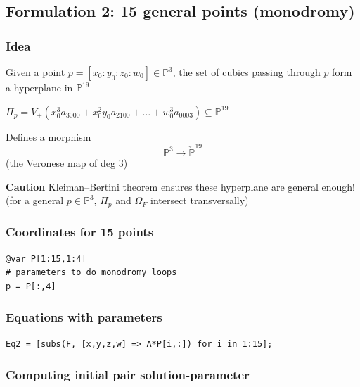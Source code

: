 \documentclass[11pt]{article}
\begin{document}
\subsection{Formulation 2: 15 general points (monodromy)}
\label{sec:orgadba504}

\subsubsection{Idea}
\label{sec:orge570c2a}

Given a point \(p=[x_0:y_0:z_0:w_0]\in \mathbb{P}^3\),
the set of cubics passing through \(p\) form a hyperplane in \(\mathbb{P}^{19}\)

\(\Pi_p=V_{+}(x_0^3a_{3000}+x_0^2y_0a_{2100}+\dots+w_0^3a_{0003})\subseteq \mathbb{P}^{19}\)

Defines a morphism  $$\mathbb{P}^3\to \check{\mathbb{P}}^{19}$$ (the Veronese map of deg 3)

\textbf{Caution} Kleiman–Bertini theorem ensures these hyperplane are general enough!
          (for a general \(p\in \mathbb{P}^3\), \(\Pi_p\) and \(\Omega_F\) intersect transversally)

\subsubsection{Coordinates for 15 points}
\label{sec:org944217c}

\begin{verbatim}
@var P[1:15,1:4]
# parameters to do monodromy loops
p = P[:,4]
\end{verbatim}

\subsubsection{Equations with parameters}
\label{sec:orgac5be9d}

\begin{verbatim}
Eq2 = [subs(F, [x,y,z,w] => A*P[i,:]) for i in 1:15];
\end{verbatim}

\subsubsection{Computing initial pair solution-parameter}
\label{sec:orgebd9112}
\end{document}

